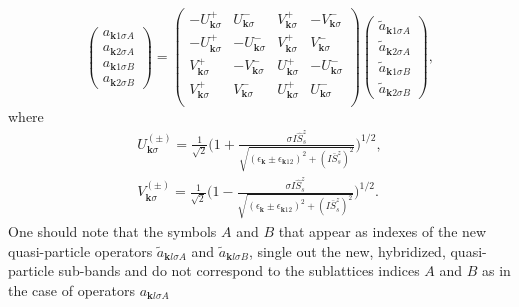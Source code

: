 \documentclass[aps,prb,showpacs,reprint]{revtex4-1}
\begin{document}
\begin{equation}
\left(\begin{array}{cl}
        a_{\mathbf{k}1\sigma A}\\
        a_{\mathbf{k}2\sigma A}\\
        a_{\mathbf{k}1\sigma B}\\
        a_{\mathbf{k}2\sigma B}
       \end{array}\right)=\left(\begin{array}{cccc}
-U^+_{\mathbf{k}\sigma} & U^-_{\mathbf{k}\sigma} & V^+_{\mathbf{k}\sigma} &
-V^-_{\mathbf{k}\sigma}\\
-U^+_{\mathbf{k}\sigma} & -U^-_{\mathbf{k}\sigma} & V^+_{\mathbf{k}\sigma} &
V^-_{\mathbf{k}\sigma}\\
V^+_{\mathbf{k}\sigma} & -V^-_{\mathbf{k}\sigma} & U^+_{\mathbf{k}\sigma} &
-U^-_{\mathbf{k}\sigma}\\
V^+_{\mathbf{k}\sigma} & V^-_{\mathbf{k}\sigma} & U^+_{\mathbf{k}\sigma} &
U^-_{\mathbf{k}\sigma}\\
\end{array}\right)\left(\begin{array}{cl}
        \tilde{a}_{\mathbf{k}1\sigma A}\\
        \tilde{a}_{\mathbf{k}2\sigma A}\\
        \tilde{a}_{\mathbf{k}1\sigma B}\\
        \tilde{a}_{\mathbf{k}2\sigma B}
       \end{array}\right),
\label{eq:quasi1}
\end{equation}
where 
\begin{equation}
\begin{split}
U^{(\pm)}_{\mathbf{k}\sigma}=\frac{1}{\sqrt{2}}\bigg(1+\frac{\sigma
I\hat{S}^z_s}{\sqrt{ (\epsilon_ {\mathbf{k}}\pm
\epsilon_{\mathbf{k}12})^2+(I\bar{S}^z_s)^2}}\bigg)^{1/2},\\
V^{(\pm)}_{\mathbf{k}\sigma}=\frac{1}{\sqrt{2}}\bigg(1-\frac{\sigma
I\hat{S}^z_s}{\sqrt{
(\epsilon_ {\mathbf{k}}\pm
\epsilon_{\mathbf{k}12})^2+(I\bar{S}^z_s)^2}}\bigg)^{1/2}.
\label{eq:oznaczenia_U_V_A_S}
\end{split}
\end{equation}
One should note that the symbols $A$ and $B$ that appear as indexes of the
new quasi-particle operators $\tilde{a}_{\mathbf{k}l\sigma A}$
and $\tilde{a}_{\mathbf{k}l\sigma B}$, single out the new, hybridized,
quasi-particle sub-bands and do not correspond to the sublattices indices
$A$ and $B$
as in the case of operators $a_{\mathbf{k}l\sigma A}$
\end{document}
